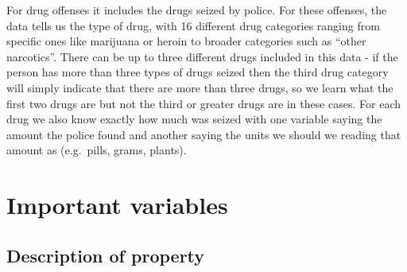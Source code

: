 \documentclass[
  12pt,
  openany]{book}
\begin{document}
For drug offenses it includes the drugs seized by police. For these offenses, the data tells us the type of drug, with 16 different drug categories ranging from specific ones like marijuana or heroin to broader categories such as ``other narcotics''. There can be up to three different drugs included in this data - if the person has more than three types of drugs seized then the third drug category will simply indicate that there are more than three drugs, so we learn what the first two drugs are but not the third or greater drugs are in these cases. For each drug we also know exactly how much was seized with one variable saying the amount the police found and another saying the units we should we reading that amount as (e.g.~pills, grams, plants).

\hypertarget{important-variables-5}{%
\section{Important variables}\label{important-variables-5}}

\hypertarget{description-of-property}{%
\subsection{Description of property}\label{description-of-property}}
\end{document}
